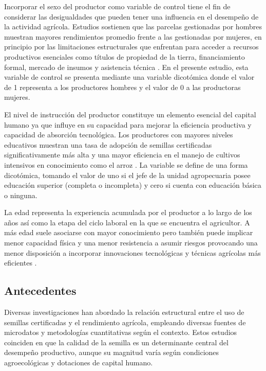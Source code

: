 \documentclass[11pt,a4paper,twocolumn]{article}
\begin{document}
Incorporar el sexo del productor como variable de control tiene el fin de considerar las desigualdades que pueden tener una influencia en el desempeño de la actividad agrícola. Estudios sostienen que las parcelas gestionadas por hombres muestran mayores rendimientos promedio frente a las gestionadas por mujeres, en principio por las limitaciones estructurales que enfrentan para acceder a recursos productivos esenciales como títulos de propiedad de la tierra, financiamiento formal, mercado de insumos y asistencia técnica \citep{aguilar2015}. En el presente estudio, esta variable de control se presenta mediante una variable dicotómica donde el valor de 1 representa a los productores hombres y el valor de 0 a las productoras mujeres.

El nivel de instrucción del productor constituye un elemento esencial del capital humano ya que influye en su capacidad para mejorar la eficiencia productiva y capacidad de absorción tecnológica. Los productores con mayores niveles educativos muestran una tasa de adopción de semillas certificadas significativamente más alta y una mayor eficiencia en el manejo de cultivos intensivos en conocimiento como el arroz \citep{ma2020}. La variable se define de una forma dicotómica, tomando el valor de uno si el jefe de la unidad agropecuaria posee educación superior (completa o incompleta) y cero si cuenta con educación básica o ninguna.

La edad representa la experiencia acumulada por el productor a lo largo de los años así como la etapa del ciclo laboral en la que se encuentra el agricultor. A más edad suele asociarse con mayor conocimiento pero también puede implicar menor capacidad física y una menor resistencia a asumir riesgos provocando una menor disposición a incorporar innovaciones tecnológicas y técnicas agrícolas más eficientes \citep{ouedraogo2021}.

\subsection{Antecedentes}
Diversas investigaciones han abordado la relación estructural entre el uso de semillas certificadas y el rendimiento agrícola, empleando diversas fuentes de microdatos y metodologías cuantitativas según el contexto. Estos estudios coinciden en que la calidad de la semilla es un determinante central del desempeño productivo, aunque su magnitud varía según condiciones agroecológicas y dotaciones de capital humano.
\end{document}
